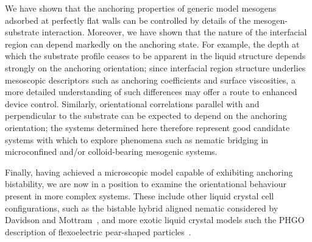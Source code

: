 \documentclass[aps,10pt,twocolumn]{revtex4}
\begin{document}
We have shown that the anchoring properties of generic model mesogens adsorbed at perfectly flat walls can be
controlled by details of the mesogen-substrate interaction. Moreover, we have shown that the nature of the
interfacial region can depend markedly on the anchoring state. For example, the depth at which the substrate
profile ceases to be apparent in the liquid structure depends strongly on the anchoring orientation; since
interfacial region structure underlies mesoscopic descriptors such as anchoring coefficients and surface
viscosities, a more detailed understanding of such differences may offer a route to enhanced device control.
Similarly, orientational correlations parallel with and perpendicular to the substrate can be expected to depend
on the anchoring orientation; the systems determined here therefore represent good candidate systems with which to
explore phenomena such as nematic bridging in microconfined and/or colloid-bearing mesogenic systems.

Finally, having achieved a microscopic model capable of exhibiting anchoring bistability, we are now in a position
to examine the orientational behaviour present in more complex systems. These include other liquid crystal cell
configurations, such as the bistable hybrid aligned nematic considered by Davidson and
Mottram~\cite{DavidsonMottram02}, and more exotic liquid crystal models such the PHGO description of flexoelectric
pear-shaped particles~\cite{BarmesCleaver03}.
\end{document}
